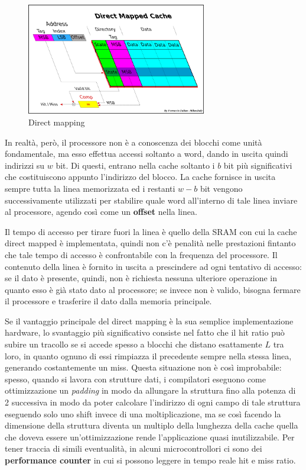 \documentclass[11pt,4paper]{report}
\begin{document}
\begin{figure}[hbtp]
	\centering
	\includegraphics[width=0.7\textwidth]{mem_sys/direct_mapping}
	\caption{Direct mapping}
	\label{fig:direct_mapping}
\end{figure}

In realtà, però, il processore non è a conoscenza dei blocchi come unità fondamentale, ma esso effettua accessi soltanto a word, dando in uscita quindi indirizzi su $w$ bit. Di questi, entrano nella cache soltanto i $b$ bit più significativi che costituiscono appunto l'indirizzo del blocco. La cache fornisce in uscita sempre tutta la linea memorizzata ed i restanti $w-b$ bit vengono successivamente utilizzati per stabilire quale word all'interno di tale linea inviare al processore, agendo così come un \textbf{offset} nella linea.

Il tempo di accesso per tirare fuori la linea è quello della SRAM con cui la cache direct mapped è implementata, quindi non c'è penalità nelle prestazioni fintanto che tale tempo di accesso è confrontabile con la frequenza del processore. Il contenuto della linea è fornito in uscita a prescindere ad ogni tentativo di accesso: se il dato è presente, quindi, non è richiesta nessuna ulteriore operazione in quanto esso è già stato dato al processore; se invece non è valido, bisogna fermare il processore e trasferire il dato dalla memoria principale.

Se il vantaggio principale del direct mapping è la sua semplice implementazione hardware, lo svantaggio più significativo consiste nel fatto che il hit ratio può subire un tracollo se si accede spesso a blocchi che distano esattamente $L$ tra loro, in quanto ognuno di essi rimpiazza il precedente sempre nella stessa linea, generando costantemente un miss. Questa situazione non è così improbabile: spesso, quando si lavora con strutture dati, i compilatori eseguono come ottimizzazione un \emph{padding} in modo da allungare la struttura fino alla potenza di 2 successiva in modo da poter calcolare l'indirizzo di ogni campo di tale struttura eseguendo solo uno shift invece di una moltiplicazione, ma se così facendo la dimensione della struttura diventa un multiplo della lunghezza della cache quella che doveva essere un'ottimizzazione rende l'applicazione quasi inutilizzabile. Per tener traccia di simili eventualità, in alcuni microcontrollori ci sono dei \textbf{performance counter} in cui si possono leggere in tempo reale hit e miss ratio.
\end{document}
